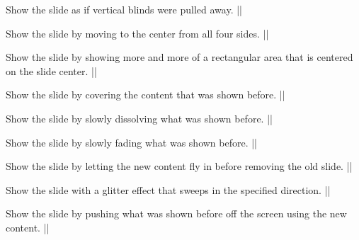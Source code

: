 \begin{command}{\transblindsvertical{}}
  Show the slide as if vertical blinds were pulled away.
  \example||
\end{command}

\begin{command}{\transboxin{}}
  Show the slide by moving to the center from all four sides.
  \example||
\end{command}

\begin{command}{\transboxout{}}
  Show the slide by showing more and more of a rectangular area that is centered on the slide center.
  \example|\transboxout|
\end{command}

\begin{command}{\transcover{}}
  Show the slide by covering the content that was shown before.
  \example|\transcover|
\end{command}

\begin{command}{\transdissolve{}}
  Show the slide by slowly dissolving what was shown before.
  \example|\transdissolve[duration=0.2]|
\end{command}

\begin{command}{\transfade{}}
  Show the slide by slowly fading what was shown before.
  \example|\transfade|
\end{command}

\begin{command}{\transfly{}}
  Show the slide by letting the new content fly in before removing the old slide.
  \example|\transfly[direction=180]|
\end{command}

\begin{command}{\transglitter{}}
  Show the slide with a glitter effect that sweeps in the specified direction.
  \example||
\end{command}

\begin{command}{\transpush{}}
  Show the slide by pushing what was shown before off the screen using
  the new content.
  \example|\transpush|
\end{command}

